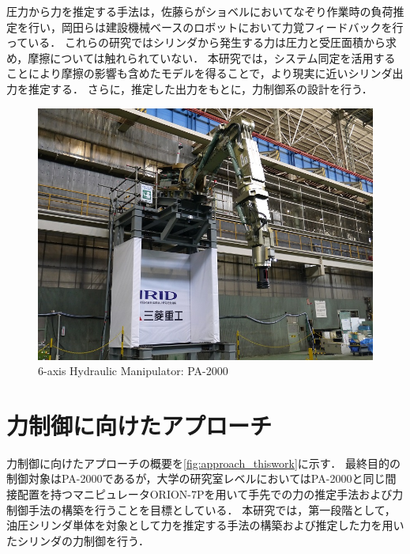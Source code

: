 圧力から力を推定する手法は，佐藤ら\cite{佐藤有香理2015油圧ショベルにおけるバケット先端の負荷力推定}がショベルにおいてなぞり作業時の負荷推定を行い，岡田ら\cite{岡田大貴2016多自由度油圧駆動ロボットのシリンダ圧に基づく手先負荷力推定,岡田大貴2017多自由度油圧駆動ロボットのシリンダ圧に基づく手先負荷力推定による力覚フィードバック}は建設機械ベースのロボットにおいて力覚フィードバックを行っている．
これらの研究ではシリンダから発生する力は圧力と受圧面積から求め，摩擦については触れられていない．
本研究では，システム同定を活用することにより摩擦の影響も含めたモデルを得ることで，より現実に近いシリンダ出力を推定する．
さらに，推定した出力をもとに，力制御系の設計を行う．

\begin{figure}[t]
    \centering
        \includegraphics[keepaspectratio, width = .8\linewidth]{contents/緒言/figure/PA-2000.jpg}
        \caption{6-axis Hydraulic Manipulator: PA-2000}
        \label{fig:PA-2000}
\end{figure}

\section{力制御に向けたアプローチ}
力制御に向けたアプローチの概要を\figname\ref{fig:approach_thiswork}に示す．
最終目的の制御対象はPA-2000であるが，大学の研究室レベルにおいてはPA-2000と同じ間接配置を持つマニピュレータORION-7Pを用いて手先での力の推定手法および力制御手法の構築を行うことを目標としている．
本研究では，第一段階として，油圧シリンダ単体を対象として力を推定する手法の構築および推定した力を用いたシリンダの力制御を行う．


